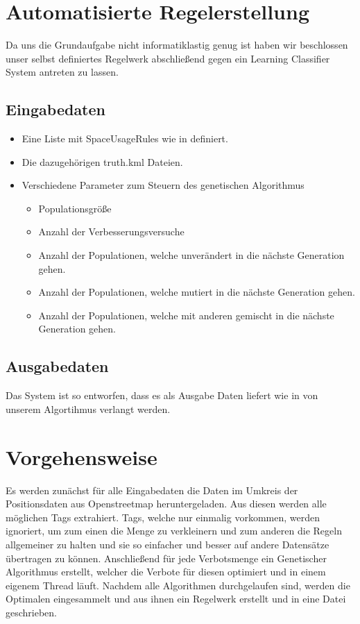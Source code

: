 \section{Automatisierte Regelerstellung}
Da uns die Grundaufgabe nicht informatiklastig genug ist
haben wir beschlossen unser selbst definiertes Regelwerk abschließend gegen ein Learning Classifier System antreten zu lassen.

\subsection{Eingabedaten}
\begin{itemize}
\item Eine Liste mit SpaceUsageRules wie in  definiert.
\item Die dazugehörigen truth.kml Dateien.
\item Verschiedene Parameter zum Steuern des genetischen Algorithmus
  \begin{itemize}
  \item Populationsgröße
  \item Anzahl der Verbesserungsversuche
  \item Anzahl der Populationen, welche unverändert in die nächste Generation gehen.
  \item Anzahl der Populationen, welche mutiert in die nächste Generation gehen.
  \item Anzahl der Populationen, welche mit anderen gemischt in die nächste Generation gehen.
  \end{itemize}
\end{itemize}

\subsection{Ausgabedaten}
Das System ist so entworfen, dass es als Ausgabe Daten liefert wie in  von unserem Algortihmus verlangt werden.

\section{Vorgehensweise}
Es werden zunächst für alle Eingabedaten die Daten im Umkreis der Positionsdaten aus Openstreetmap heruntergeladen.
Aus diesen werden alle möglichen Tags extrahiert. Tags, welche nur einmalig vorkommen, werden ignoriert, um zum einen die Menge zu verkleinern
und zum anderen die Regeln allgemeiner zu halten und sie so einfacher und besser auf andere Datensätze übertragen zu können.
Anschließend für jede Verbotsmenge ein Genetischer Algorithmus erstellt, welcher die Verbote für diesen optimiert und in einem eigenem Thread läuft.
Nachdem alle Algorithmen durchgelaufen sind, werden die Optimalen eingesammelt und aus ihnen ein Regelwerk erstellt und in eine Datei geschrieben.

